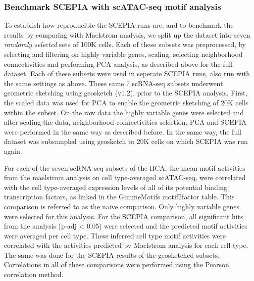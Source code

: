 \subsubsection{Benchmark SCEPIA with scATAC-seq motif analysis}
To establish how reproducible the SCEPIA runs are, and to benchmark the results by comparing with Maelstrom analysis, we split up the dataset into seven \textit{randomly selected} sets of 100K cells. Each of these subsets was preprocessed, by selecting and filtering on highly variable genes, scaling, selecting neighborhood connectivities and performing PCA analysis, as described above for the full dataset. Each of these subsets were used in seperate SCEPIA runs, also run with the same settings as above. These same 7 scRNA-seq subsets underwent geometric sketching using geosketch (v1.2), prior to the SCEPIA analysis. First, the scaled data was used for PCA to enable the geometric sketching of 20K cells within the subset. On the raw data the highly variable genes were selected and after scaling the data, neighborhood connectivities selection, PCA and SCEPIA were performed in the same way as described before. In the same way, the full dataset was subsampled using geosketch to 20K cells on which SCEPIA was run again.

For each of the seven scRNA-seq subsets of the HCA, the mean motif activities from the maelstrom analysis on cell type-averaged scATAC-seq, were correlated with the cell type-averaged expression levels of all of its potential binding transcription factors, as linked in the GimmeMotifs motif2factor table. This comparison is referred to as the naive comparison. Only highly variable genes were selected for this analysis. For the SCEPIA comparison, all significant hits from the analysis (p-adj < 0.05) were selected and the predicted motif activities were averaged per cell type. These inferred cell type motif activities were correlated with the activities predicted by Maelstrom analysis for each cell type. The same was done for the SCEPIA results of the geosketched subsets. Correlations in all of these comparisons were performed using the Pearson correlation method.

